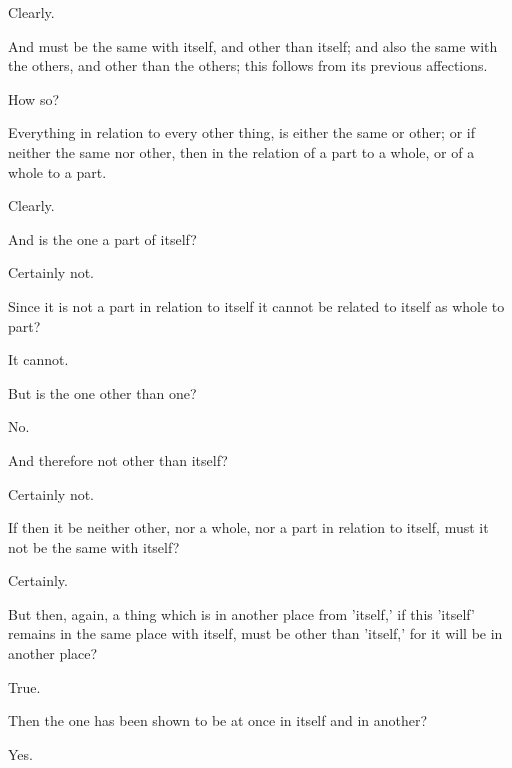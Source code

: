 \documentclass[11pt,letter]{article}
\begin{document}
\par  Clearly.

\par  And must be the same with itself, and other than itself; and also the same with the others, and other than the others; this follows from its previous affections.

\par  How so?

\par  Everything in relation to every other thing, is either the same or other; or if neither the same nor other, then in the relation of a part to a whole, or of a whole to a part.

\par  Clearly.

\par  And is the one a part of itself?

\par  Certainly not.

\par  Since it is not a part in relation to itself it cannot be related to itself as whole to part?

\par  It cannot.

\par  But is the one other than one?

\par  No.

\par  And therefore not other than itself?

\par  Certainly not.

\par  If then it be neither other, nor a whole, nor a part in relation to itself, must it not be the same with itself?

\par  Certainly.

\par  But then, again, a thing which is in another place from 'itself,' if this 'itself' remains in the same place with itself, must be other than 'itself,' for it will be in another place?

\par  True.

\par  Then the one has been shown to be at once in itself and in another?

\par  Yes.
\end{document}
